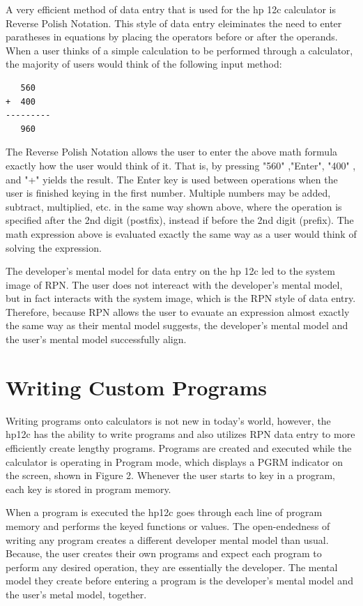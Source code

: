\documentclass{article}
\begin{document}
A very efficient method of data entry that is used for the hp 12c calculator is Reverse Polish Notation. This style of data entry eleiminates the need to enter paratheses in equations by placing the operators before or after the operands. When a user thinks of a simple calculation to be performed through a calculator, the majority of users would think of the following input method:
\begin{verbatim}
   560
+  400
---------
   960
\end{verbatim}
The Reverse Polish Notation allows the user to enter the above math formula exactly how the user would think of it. That is, by pressing "560" ,"Enter",  "400" , and "+"  yields the result. The Enter key is used between operations when the user is finished keying in the first number. Multiple numbers may be added, subtract, multiplied, etc. in the same way shown above, where the operation is specified after the 2nd digit (postfix), instead if before the 2nd digit (prefix). The math expression above is evaluated exactly the same way as a user would think of solving the expression.

The developer's mental model for data entry on the hp 12c led to the system image of RPN. The user does not intereact with the developer's mental model, but in fact interacts with the system image, which is the RPN style of data entry. Therefore, because RPN allows the user to evauate an expression almost exactly the same way as their mental model suggests, the developer's mental model and the user's mental model successfully align.

\section{Writing Custom Programs}

Writing programs onto calculators is not new in today's world, however, the hp12c has the ability to write programs and also utilizes RPN data entry to more efficiently create lengthy programs. Programs are created and executed while the calculator is operating in Program mode, which displays a PGRM indicator on the screen, shown in Figure 2. Whenever the user starts to key in a program, each key is stored in program memory. 

When a program is executed the hp12c goes through each line of program memory and performs the keyed functions or values. The open-endedness of writing any program creates a different developer mental model than usual. Because, the user creates their own programs and expect each program to perform any desired operation, they are essentially the developer. The mental model they create before entering a program is the developer's mental model and the user's metal model, together. 
\end{document}
